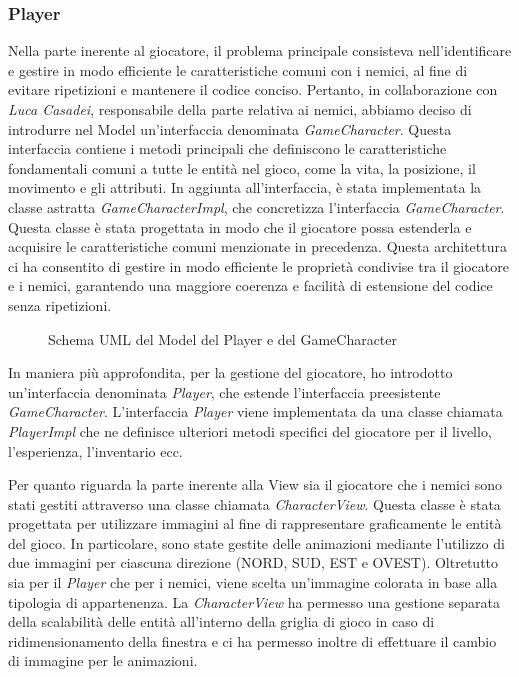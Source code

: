 \documentclass[a4paper,12pt]{report}
\begin{document}
\subsubsection{Player} \label{ss:player}
Nella parte inerente al giocatore, il problema principale consisteva nell'identificare e gestire in modo efficiente le caratteristiche comuni con i nemici, al fine di evitare ripetizioni e mantenere il codice conciso. 
Pertanto, in collaborazione con \textit{Luca Casadei}, responsabile della parte relativa ai nemici, abbiamo deciso di introdurre nel Model un'interfaccia denominata \textit{GameCharacter}. Questa interfaccia contiene i metodi principali che definiscono le caratteristiche fondamentali comuni a tutte le entità nel gioco, come la vita, la posizione, il movimento e gli attributi.
In aggiunta all'interfaccia, è stata implementata la classe astratta \textit{GameCharacterImpl}, che concretizza l'interfaccia \textit{GameCharacter}. Questa classe è stata progettata in modo che il giocatore possa estenderla e acquisire le caratteristiche comuni menzionate in precedenza. Questa architettura ci ha consentito di gestire in modo efficiente le proprietà condivise tra il giocatore e i nemici, garantendo una maggiore coerenza e facilità di estensione del codice senza ripetizioni.

\begin{figure}[H]
	\centering
	
	\caption{Schema UML del Model del Player e del GameCharacter}
	\label{fig:the-exiled-player-uml}
\end{figure}

In maniera più approfondita, per la gestione del giocatore, ho introdotto un'interfaccia denominata \textit{Player}, che estende l'interfaccia preesistente \textit{GameCharacter}. 
L'interfaccia \textit{Player} viene implementata da una classe chiamata \textit{PlayerImpl} che ne definisce ulteriori metodi specifici del giocatore per il livello, l'esperienza, l'inventario ecc. 

Per quanto riguarda la parte inerente alla View sia il giocatore che i nemici sono stati gestiti attraverso una classe chiamata \textit{CharacterView}. Questa classe è stata progettata per utilizzare immagini al fine di rappresentare graficamente le entità del gioco. In particolare, sono state gestite delle animazioni mediante l'utilizzo di due immagini per ciascuna direzione (NORD, SUD, EST e OVEST). Oltretutto sia per il \textit{Player} che per i nemici, viene scelta un'immagine colorata in base alla tipologia di appartenenza. La \textit{CharacterView} ha permesso una gestione separata della scalabilità delle entità all'interno della griglia di gioco in caso di ridimensionamento della finestra e ci ha permesso inoltre di effettuare il cambio di immagine per le animazioni.
\end{document}
